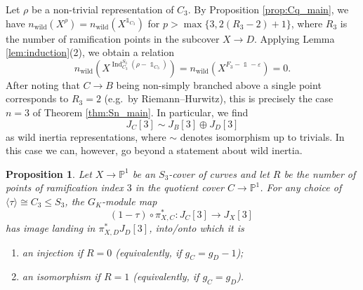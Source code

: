 \documentclass[12pt]{amsart}
\newtheorem{proposition}[theorem]{Proposition}
\theoremstyle{definition}
\theoremstyle{remark}
\newcommand{\eps}{\varepsilon}
\newcommand{\Proj}{\mathbb{P}}
\DeclareMathOperator{\Ind}{Ind}
\DeclareMathOperator{\wild}{wild}
\DeclareMathOperator{\one}{\mathds{1}}
\begin{document}
Let $\rho$ be a non-trivial representation of $C_3$. By Proposition \ref{prop:Cq_main}, we have $n_{\wild}(X^\rho)=n_{\wild}(X^{\one_{C_3}})$ for $p>\max\{3,2(R_3-2)+1\}$, where $R_3$ is the number of ramification points in the subcover $X\to D$. Applying Lemma \ref{lem:induction}(2), we obtain a relation 
\[n_{\wild}(X^{\Ind_{C_3}^{S_3}(\rho-\one_{C_3})})=n_{\wild}(X^{F_3-\one-\eps})=0.\] 
After noting that $C\to B$ being non-simply branched above a single point corresponds to $R_3=2$ (e.g.\ by Riemann--Hurwitz), this is precisely the case $n=3$ of Theorem \ref{thm:Sn_main}. In particular, we find
\[ J_C[3] \sim J_B[3] \oplus J_D[3] \]
as wild inertia representations, where $\sim$ denotes isomorphism up to trivials. In this case we can, however, go beyond a statement about wild inertia.

\begin{proposition}\label{prop:S3_case}
    Let $X\to\Proj^1$ be an $S_3$-cover of curves and let $R$ be the number of points of ramification index $3$ in the quotient cover $C\to\Proj^1$. For any choice of $\langle\tau\rangle \cong C_3\le S_3$, the $G_K$-module map 
    \begin{equation}\tag{$\ddagger$}\label{eqn:GalIsom}
        (1-\tau)\circ \pi_{X,C}^* \colon J_C[3] \to J_X[3]
\    \end{equation}
    has image landing in $\pi_{X,D}^*J_D[3]$, into/onto which it is
    \begin{enumerate}
        \item an injection if $R=0$ (equivalently, if $g_C=g_D-1$);
        \item an isomorphism if $R=1$ (equivalently, if $g_C=g_D$).
    \end{enumerate}
\end{proposition}
\end{document}
